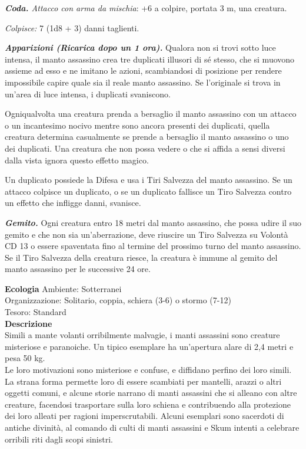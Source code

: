 \begin{multicols}{2}
\emph{\textbf{Coda.} Attacco con arma da mischia}: +6 a colpire, portata 3 m, una creatura.

\emph{Colpisce:} 7 (1d8 + 3) danni taglienti.

\emph{\textbf{Apparizioni (Ricarica dopo un 1 ora).}} Qualora non si trovi sotto luce intensa, il manto assassino crea tre duplicati illusori di sé stesso, che si muovono assieme ad esso e ne imitano le azioni, scambiandosi di posizione per rendere impossibile capire quale sia il reale manto assassino. Se l'originale si trova in un'area di luce intensa, i duplicati svaniscono.

Ogniqualvolta una creatura prenda a bersaglio il manto assassino con un attacco o un incantesimo nocivo mentre sono ancora presenti dei duplicati, quella creatura determina casualmente se prende a bersaglio il manto assassino o uno dei duplicati. Una creatura che non possa vedere o che si affida a sensi diversi dalla vista ignora questo effetto magico.

Un duplicato possiede la Difesa e usa i Tiri Salvezza del manto assassino. Se un attacco colpisce un duplicato, o se un duplicato fallisce un Tiro Salvezza contro un effetto che infligge danni, svanisce.

\emph{\textbf{Gemito.}} Ogni creatura entro 18 metri dal manto assassino, che possa udire il suo gemito e che non sia un'aberrazione, deve riuscire un Tiro Salvezza su Volontà CD 13 o essere spaventata fino al termine del prossimo turno del manto assassino. Se il Tiro Salvezza della creatura
riesce, la creatura è immune al gemito del manto assassino per le successive 24 ore.

\textbf{Ecologia}
Ambiente: Sotterranei\\
Organizzazione: Solitario, coppia, schiera (3-6) o stormo (7-12)\\
Tesoro: Standard\\
\textbf{Descrizione}\\
Simili a mante volanti orribilmente malvagie, i manti assassini sono creature misteriose e paranoiche. Un tipico esemplare ha un'apertura alare di 2,4 metri e pesa 50 kg.\\

Le loro motivazioni sono misteriose e confuse, e diffidano perfino dei loro simili. La strana forma permette loro di essere scambiati per mantelli, arazzi o altri oggetti comuni, e alcune storie narrano di manti assassini che si alleano con altre creature, facendosi trasportare sulla loro schiena e contribuendo alla protezione dei loro alleati per ragioni imperscrutabili. Alcuni esemplari sono sacerdoti di antiche divinità, al comando di culti di manti assassini e Skum intenti a celebrare orribili riti dagli scopi sinistri.\\



\end{multicols}
